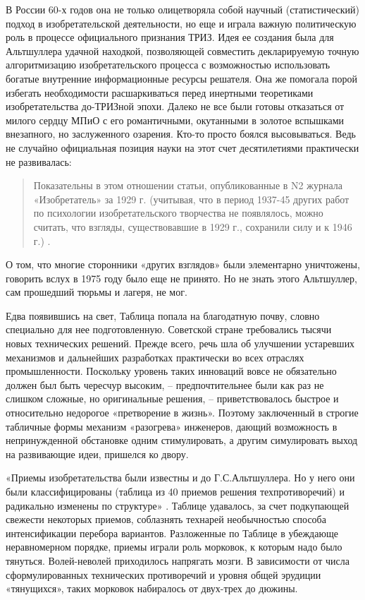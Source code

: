 \documentclass[11pt,a4paper]{article}
\begin{document}
В России 60-х годов она не только олицетворяла собой научный (статистический)
подход в изобретательской деятельности, но еще и играла важную политическую
роль в процессе официального признания ТРИЗ. Идея ее создания была для
Альтшуллера удачной находкой, позволяющей совместить декларируемую точную
алгоритмизацию изобретательского процесса с возможностью использовать богатые
внутренние информационные ресурсы решателя. Она же помогала порой избегать
необходимости расшаркиваться перед инертными теоретиками изобретательства
до-ТРИЗной эпохи. Далеко не все были готовы отказаться от милого сердцу МПиО с
его романтичными, окутанными в золотое вспышками внезапного, но заслуженного
озарения. Кто-то просто боялся высовываться. Ведь не случайно официальная
позиция науки на этот счет десятилетиями практически не развивалась:
\begin{quote}
  Показательны в этом отношении статьи, опубликованные в N2 журнала
  «Изобретатель» за 1929 г. (учитывая, что в период 1937-45 других работ по
  психологии изобретательского творчества не появлялось, можно считать, что
  взгляды, существовавшие в 1929 г., сохранили силу и к 1946 г.)
  \cite{Altshuller1975}.
\end{quote}
О том, что многие сторонники «других взглядов» были элементарно уничтожены,
говорить вслух в 1975 году было еще не принято. Но не знать этого Альтшуллер,
сам прошедший тюрьмы и лагеря, не мог.

Едва появившись на свет, Таблица попала на благодатную почву, словно
специально для нее подготовленную. Советской стране требовались тысячи новых
технических решений. Прежде всего, речь шла об улучшении устаревших механизмов
и дальнейших разработках практически во всех отраслях промышленности.
Поскольку уровень таких инноваций вовсе не обязательно должен был быть
чересчур высоким, -- предпочтительнее были как раз не слишком сложные, но
оригинальные решения, -- приветствовалось быстрое и относительно недорогое
«претворение в жизнь». Поэтому заключенный в строгие табличные формы механизм
«разогрева» инженеров, дающий возможность в непринужденной обстановке одним
стимулировать, а другим симулировать выход на развивающие идеи, пришелся ко
двору.

«Приемы изобретательства были известны и до Г.С.Альтшуллера. Но у него они
были классифицированы (таблица из 40 приемов решения техпротиворечий) и
радикально изменены по структуре» \cite{Murashkovsky2003}. Таблице
удавалось, за счет подкупающей свежести некоторых приемов, соблазнять технарей
необычностью способа интенсификации перебора вариантов. Разложенные по Таблице
в убеждающе неравномерном порядке, приемы играли роль морковок, к которым надо
было тянуться. Волей-неволей приходилось напрягать мозги. В зависимости от
числа сформулированных технических противоречий и уровня общей эрудиции
«тянущихся», таких морковок набиралось от двух-трех до дюжины.
\end{document}
